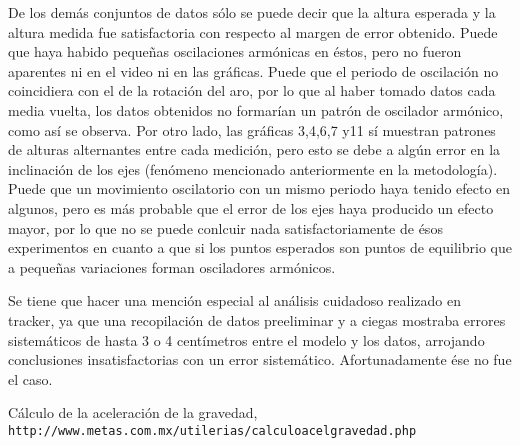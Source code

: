 \documentclass[12p]{article}
\begin{document}
De los demás conjuntos de datos sólo se puede decir que la altura esperada y la altura medida fue satisfactoria con respecto al margen de error obtenido. Puede que haya habido pequeñas oscilaciones armónicas en éstos, pero no fueron aparentes ni en el video ni en las gráficas. Puede que el periodo de oscilación no coincidiera con el de la rotación del aro, por lo que al haber tomado datos cada media vuelta, los datos obtenidos no formarían un patrón de oscilador armónico, como así se observa. Por otro lado, las gráficas 3,4,6,7 y11 sí muestran patrones de alturas alternantes entre cada medición, pero esto se debe a algún error en la inclinación de los ejes (fenómeno mencionado anteriormente en la metodología). Puede que un movimiento oscilatorio con un mismo periodo haya tenido efecto en algunos, pero es más probable que el error de los ejes haya producido un efecto mayor, por lo que no se puede conlcuir nada satisfactoriamente de ésos experimentos en cuanto a que si los puntos esperados son puntos de equilibrio que a pequeñas variaciones forman osciladores armónicos.

Se tiene que hacer una mención especial al análisis cuidadoso realizado en tracker, ya que una recopilación de datos preeliminar y a ciegas mostraba errores sistemáticos de hasta 3 o 4 centímetros entre el modelo y los datos, arrojando conclusiones insatisfactorias con un error sistemático. Afortunadamente ése no fue el caso.

\begin{thebibliography}{9}
Cálculo de la aceleración de la gravedad,
\\\texttt{http://www.metas.com.mx/utilerias/calculoacelgravedad.php}
\end{thebibliography}
\end{document}
